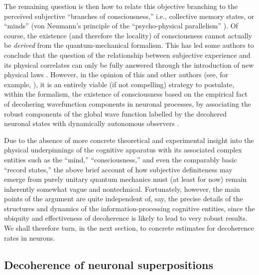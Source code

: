 \documentclass[twocolumn,aps,floatfix,amsmath,amssymb,showpacs,nofootinbib]{revtex4}
\begin{document}
The remaining question is then how to relate this objective branching
to the perceived subjective ``branches of consciousness,'' i.e.,
collective memory states, or ``minds'' (von Neumann's principle of the
``psycho-physical parallelism'' \cite{Neumann:1932:gq}). Of course,
the existence (and therefore the locality) of consciousness cannot
actually be {\em derived} from the quantum-mechanical formalism. This
has led some authors to conclude that the question of the relationship
between subjective experience and its physical correlates can only be
fully answered through the introduction of new physical laws
\cite{Donald:2002:um}.  However, in the opinion of this and other
authors (see, for example, \cite{Zeh:2000:rr,Zeh:2004:zm}), it is an
entirely viable (if not compelling) strategy to postulate, within the formalism, the
existence of consciousness based on the empirical fact of decohering
wavefunction components in neuronal processes, by associating the
robust components of the global wave function labelled by the
decohered neuronal states with dynamically autonomous observers
\cite{Zeh:1970:yt,Zeh:1973:wq,Lockwood:1996:pu,Zurek:1998:re,%
Zeh:2000:rr,Zurek:2002:ii,Zeh:2004:zm,Zurek:2004:yb}.

Due to the absence of more concrete theoretical and experimental
insight into the physical underpinnings of the cognitive apparatus
with its associated complex entities such as the ``mind,''
``consciousness,'' and even the comparably basic ``record states,''
the above brief account of how subjective definiteness may emerge from
purely unitary quantum mechanics must (at least for now) remain
inherently somewhat vague and nontechnical. Fortunately, however, the
main points of the argument are quite independent of, say, the precise
details of the structures and dynamics of the information-processing
cognitive entities, since the ubiquity and effectiveness of
decoherence is likely to lead to very robust results.  We shall
therefore turn, in the next section, to concrete estimates for 
decoherence rates in neurons.



\subsection{Decoherence of neuronal superpositions}
\end{document}
